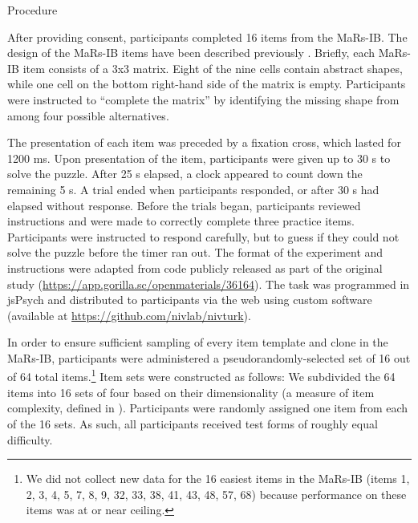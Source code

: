 \documentclass[a4paper,man,natbib,noextraspace]{apa6}
\makeatletter
\renewcommand{\subsubsection}{\@startsection{subsubsection}{3}
  {\z@}%
  {\b@level@two@skip}{\e@level@two@skip}%
  {\normalfont\normalsize\bfseries}}
\makeatother
\begin{document}
\subsubsection{Procedure}

After providing consent, participants completed 16 items from the MaRs-IB. The design of the MaRs-IB items have been described previously \citep{chierchia2019matrix}. Briefly, each MaRs-IB item consists of a 3x3 matrix. Eight of the nine cells contain abstract shapes, while one cell on the bottom right-hand side of the matrix is empty. Participants were instructed to ``complete the matrix'' by identifying the missing shape from among four possible alternatives. 

The presentation of each item was preceded by a fixation cross, which lasted for 1200 ms. Upon presentation of the item, participants were given up to 30 s to solve the puzzle. After 25 s elapsed, a clock appeared to count down the remaining 5 s. A trial ended when participants responded, or after 30 s had elapsed without response. Before the trials began, participants reviewed instructions and were made to correctly complete three practice items. Participants were instructed to respond carefully, but to guess if they could not solve the puzzle before the timer ran out. The format of the experiment and instructions were adapted from code publicly released as part of the original study (\url{https://app.gorilla.sc/openmaterials/36164}). The task was programmed in jsPsych \citep{de2015jspsych} and distributed to participants via the web using custom software (available at \url{https://github.com/nivlab/nivturk}). 

In order to ensure sufficient sampling of every item template and clone in the MaRs-IB, participants were administered a pseudorandomly-selected set of 16 out of 64 total items.\footnote{We did not collect new data for the 16 easiest items in the MaRs-IB (items 1, 2, 3, 4, 5, 7, 8, 9, 32, 33, 38, 41, 43, 48, 57, 68) because performance on these items was at or near ceiling.} Item sets were constructed as follows: We subdivided the 64 items into 16 sets of four based on their dimensionality (a measure of item complexity, defined in \citealt{chierchia2019matrix}). Participants were randomly assigned one item from each of the 16 sets. As such, all participants received test forms of roughly equal difficulty. 
\end{document}
